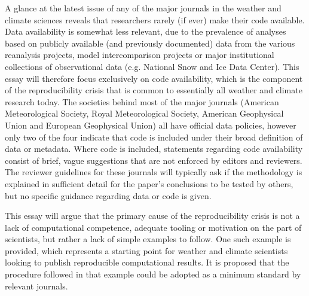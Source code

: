 A glance at the latest issue of any of the major journals in the weather and climate sciences reveals that researchers rarely (if ever) make their code available. Data availability is somewhat less relevant, due to the prevalence of analyses based on publicly available (and previously documented) data from the various reanalysis projects, model intercomparison projects or major institutional collections of observational data (e.g. National Snow and Ice Data Center). This essay will therefore focus exclusively on code availability, which is the component of the reproducibility crisis that is common to essentially all weather and climate research today. The societies behind most of the major journals (American Meteorological Society, Royal Meteorological Society, American Geophysical Union and European Geophysical Union) all have official data policies, however only two of the four indicate that code is included under their broad definition of data or metadata. Where code is included, statements regarding code availability consist of brief, vague suggestions that are not enforced by editors and reviewers. The reviewer guidelines for these journals will typically ask if the methodology is explained in sufficient detail for the paper's conclusions to be tested by others, but no specific guidance regarding data or code is given. 

This essay will argue that the primary cause of the reproducibility crisis is not a lack of computational competence, adequate tooling or motivation on the part of scientists, but rather a lack of simple examples to follow. One such example is provided, which represents a starting point for weather and climate scientists looking to publish reproducible computational results. It is proposed that the procedure followed in that example could be adopted as a minimum standard by relevant journals.
